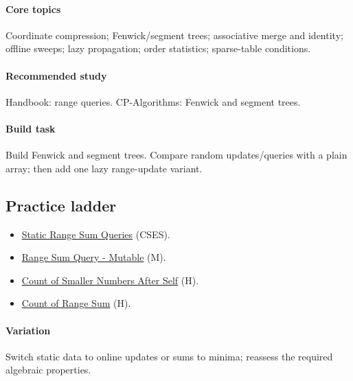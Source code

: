 \documentclass[11pt,letterpaper]{article}
\begin{document}
\paragraph*{Core topics}

Coordinate compression; Fenwick/segment trees; associative merge and identity; offline sweeps; lazy propagation; order statistics; sparse-table conditions.

\paragraph*{Recommended study}

Handbook: range queries. CP-Algorithms: Fenwick and segment trees.

\paragraph*{Build task}

Build Fenwick and segment trees. Compare random updates/queries with a plain array; then add one lazy range-update variant.

\subsection*{Practice ladder}

\begin{itemize}

\item \href{https://cses.fi/problemset/task/1646}{Static Range Sum Queries} (CSES).

\item \href{https://leetcode.com/problems/range-sum-query-mutable/}{Range Sum Query - Mutable} (M).

\item \href{https://leetcode.com/problems/count-of-smaller-numbers-after-self/}{Count of Smaller Numbers After Self} (H).

\item \href{https://leetcode.com/problems/count-of-range-sum/}{Count of Range Sum} (H).

\end{itemize}

\paragraph*{Variation}

Switch static data to online updates or sums to minima; reassess the required algebraic properties.
\end{document}
